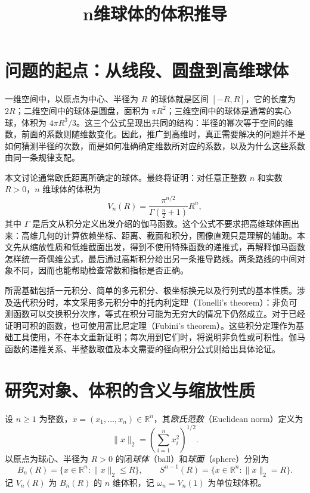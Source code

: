\documentclass[UTF8,12pt,a4paper,fontset=fandol]{ctexart}
\title{n维球体的体积推导}
\author{}
\date{}
\begin{document}
\maketitle
\tableofcontents

\section{问题的起点：从线段、圆盘到高维球体}
\label{sec:nb-introduction}

一维空间中，以原点为中心、半径为 $R$ 的球体就是区间 $[-R,R]$，它的长度为 $2R$；二维空间中的球体是圆盘，面积为 $\pi R^2$；三维空间中的球体是通常的实心球，体积为 $4\pi R^3/3$。这三个公式呈现出共同的结构：半径的幂次等于空间的维数，前面的系数则随维数变化。因此，推广到高维时，真正需要解决的问题并不是如何猜测半径的次数，而是如何准确确定维数所对应的系数，以及为什么这些系数由同一条规律支配。

本文讨论通常欧氏距离所确定的球体。最终将证明：对任意正整数 $n$ 和实数 $R>0$，$n$ 维球体的体积为
\begin{equation}\label{eq:nb-main-preview}
  V_n(R)=\frac{\pi^{n/2}}{\Gamma\!\left(\frac n2+1\right)}R^n,
\end{equation}
其中 $\Gamma$ 是后文从积分定义出发介绍的伽马函数。这个公式不要求把高维球体画出来：高维几何的计算依赖坐标、距离、截面和积分，图像直观只是理解的辅助。本文先从缩放性质和低维截面出发，得到不使用特殊函数的递推式，再解释伽马函数怎样统一奇偶维公式，最后通过高斯积分给出另一条推导路线。两条路线的中间对象不同，因而也能帮助检查常数和指标是否正确。

所需基础包括一元积分、简单的多元积分、极坐标换元以及行列式的基本性质。涉及迭代积分时，本文采用多元积分中的托内利定理（Tonelli's theorem）：非负可测函数可以交换积分次序，等式在积分可能为无穷大的情况下仍然成立。对于已经证明可积的函数，也可使用富比尼定理（Fubini's theorem）。这些积分定理作为基础工具使用，不在本文重新证明；每次用到它们时，将说明非负性或可积性。伽马函数的递推关系、半整数取值及本文需要的径向积分公式则给出具体论证。

\section{研究对象、体积的含义与缩放性质}
\label{sec:nb-definition}

\begin{definition}[欧氏球体与球面]
设 $n\geq1$ 为整数，$x=(x_1,\ldots,x_n)\in\mathbb R^n$，其\emph{欧氏范数}（Euclidean norm）定义为
\[
  \|x\|_2=\left(\sum_{i=1}^n x_i^2\right)^{1/2}.
\]
以原点为球心、半径为 $R>0$ 的闭\emph{球体}（ball）和\emph{球面}（sphere）分别为
\[
  B_n(R)=\{x\in\mathbb R^n:\|x\|_2\leq R\},\qquad
  S^{n-1}(R)=\{x\in\mathbb R^n:\|x\|_2=R\}.
\]
记 $V_n(R)$ 为 $B_n(R)$ 的 $n$ 维体积，记 $\omega_n=V_n(1)$ 为单位球体积。
\end{definition}
\end{document}
